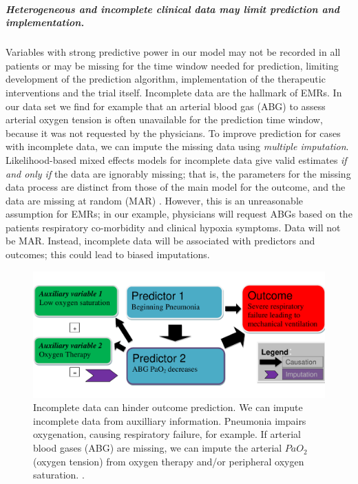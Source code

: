 \documentclass[11pt,notitlepage]{article}
\begin{document}
\subparagraph*{Heterogeneous and incomplete clinical data may limit prediction and implementation.}
Variables with strong predictive power in our model may not be recorded in all patients or may be missing for the time window needed for prediction, limiting development of the prediction algorithm, implementation of the therapeutic interventions and the trial itself. Incomplete data are the hallmark of EMRs. In our data set we find for example that an arterial blood gas (ABG) to assess arterial oxygen tension is often unavailable for the prediction time window, because it was not requested by the physicians. To improve prediction for cases with incomplete data, we can impute the missing data using \textit{multiple imputation}. Likelihood-based mixed effects models for incomplete data give valid estimates \textit{if and only if } the data are ignorably missing; that is, the parameters for the missing data process are distinct from those of the main model for the outcome, and the data are missing at random (MAR) \cite{Rubin_1976}. However, this is an unreasonable assumption for EMRs; in our example, physicians will request ABGs based on the patients respiratory co-morbidity and clinical hypoxia symptoms. Data will not be MAR. Instead, incomplete data will be associated with predictors and outcomes; this could lead to biased imputations.
\begin{figure} 
 \vspace{-10pt}
 \includegraphics[scale=0.4]{Figures/Bayesian_imputation.pdf}
    \vspace{-20pt}
  \caption{\footnotesize Incomplete data can hinder outcome prediction. We can impute incomplete data from auxilliary information. Pneumonia impairs oxygenation, causing respiratory failure, for example. If arterial blood gases (ABG) are missing, we can impute the arterial $PaO_2$ (oxygen tension) from oxygen therapy and/or peripheral oxygen saturation.  \cite{Hall_25389642}.}
   \vspace{-5pt}
    \label{fig:Imputation_fig}
\end{figure}
\end{document}
